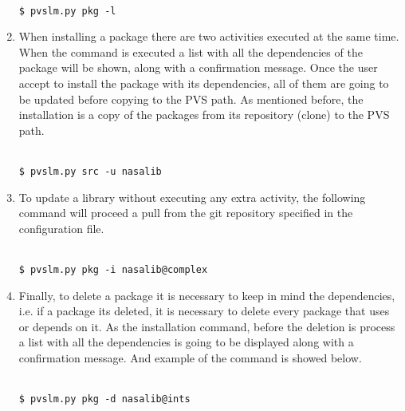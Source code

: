 \begin{enumerate}
  \texttt {\\\$ pvslm.py pkg -l\\}

\item
  When installing a package there are two activities executed at the same time. When the command is executed a list with all the dependencies of the package will be shown, along with a confirmation message. Once the user accept to install the package with its dependencies, all of them are going to be updated before copying to the PVS path. As mentioned before, the installation is a copy of the packages from its repository (clone) to the PVS path.
  
  \texttt {\\\$ pvslm.py src -u nasalib\\}

\item
  To update a library without executing any extra activity, the following command will proceed a pull from the git repository specified in the configuration file.  

  \texttt {\\\$ pvslm.py pkg -i nasalib@complex\\}

\item 
  Finally, to delete a package it is necessary to keep in mind the dependencies, i.e. if a package its deleted, it is necessary to delete every package that uses or depends on it. As the installation command, before the deletion is process a list with all the dependencies is going to be displayed along with a confirmation message. And example of the command is showed below.   

  \texttt {\\\$ pvslm.py pkg -d nasalib@ints\\}

\end{enumerate}
